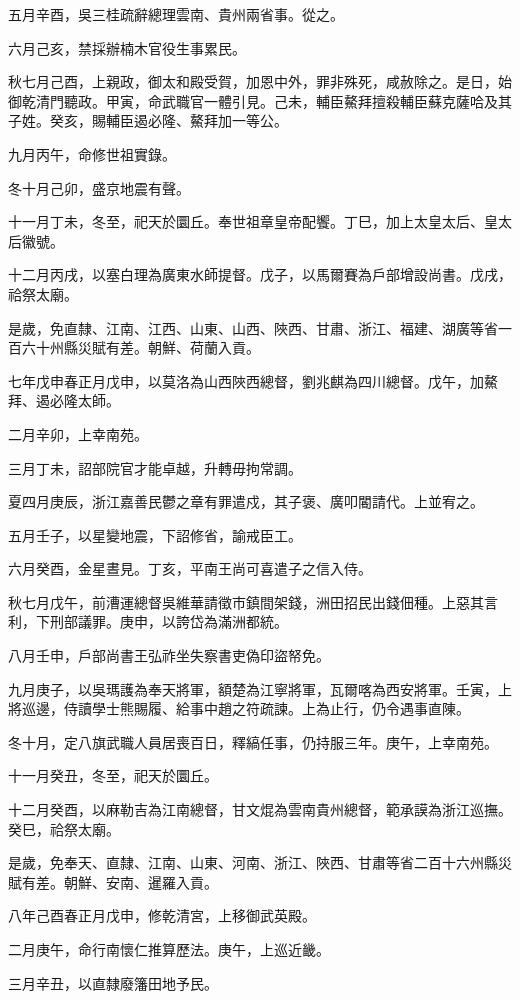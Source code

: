 \begin{pinyinscope}
五月辛酉，吳三桂疏辭總理雲南、貴州兩省事。從之。

六月己亥，禁採辦楠木官役生事累民。

秋七月己酉，上親政，御太和殿受賀，加恩中外，罪非殊死，咸赦除之。是日，始御乾清門聽政。甲寅，命武職官一體引見。己未，輔臣鰲拜擅殺輔臣蘇克薩哈及其子姓。癸亥，賜輔臣遏必隆、鰲拜加一等公。

九月丙午，命修世祖實錄。

冬十月己卯，盛京地震有聲。

十一月丁未，冬至，祀天於圜丘。奉世祖章皇帝配饗。丁巳，加上太皇太后、皇太后徽號。

十二月丙戌，以塞白理為廣東水師提督。戊子，以馬爾賽為戶部增設尚書。戊戌，祫祭太廟。

是歲，免直隸、江南、江西、山東、山西、陜西、甘肅、浙江、福建、湖廣等省一百六十州縣災賦有差。朝鮮、荷蘭入貢。

七年戊申春正月戊申，以莫洛為山西陜西總督，劉兆麒為四川總督。戊午，加鰲拜、遏必隆太師。

二月辛卯，上幸南苑。

三月丁未，詔部院官才能卓越，升轉毋拘常調。

夏四月庚辰，浙江嘉善民鬱之章有罪遣戍，其子褒、廣叩閽請代。上並宥之。

五月壬子，以星變地震，下詔修省，諭戒臣工。

六月癸酉，金星晝見。丁亥，平南王尚可喜遣子之信入侍。

秋七月戊午，前漕運總督吳維華請徵市鎮間架錢，洲田招民出錢佃種。上惡其言利，下刑部議罪。庚申，以誇岱為滿洲都統。

八月壬申，戶部尚書王弘祚坐失察書吏偽印盜帑免。

九月庚子，以吳瑪護為奉天將軍，額楚為江寧將軍，瓦爾喀為西安將軍。壬寅，上將巡邊，侍讀學士熊賜履、給事中趙之符疏諫。上為止行，仍令遇事直陳。

冬十月，定八旗武職人員居喪百日，釋縞任事，仍持服三年。庚午，上幸南苑。

十一月癸丑，冬至，祀天於圜丘。

十二月癸酉，以麻勒吉為江南總督，甘文焜為雲南貴州總督，範承謨為浙江巡撫。癸巳，祫祭太廟。

是歲，免奉天、直隸、江南、山東、河南、浙江、陜西、甘肅等省二百十六州縣災賦有差。朝鮮、安南、暹羅入貢。

八年己酉春正月戊申，修乾清宮，上移御武英殿。

二月庚午，命行南懷仁推算歷法。庚午，上巡近畿。

三月辛丑，以直隸廢籓田地予民。


\end{pinyinscope}
